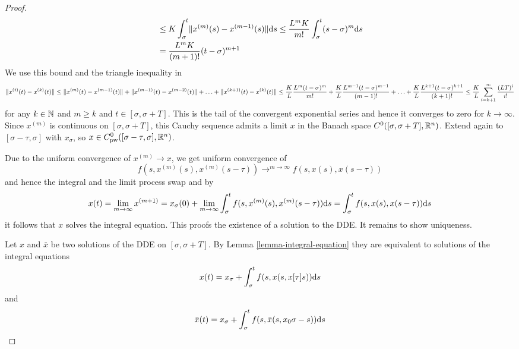 \documentclass[10pt]{article}
\begin{document}
\begin{proof}
\begin{align}
        & \leq K \int_\sigma^t \lVert x^{(m)}(s) - x^{(m-1)}(s)\rVert\text{d}s \leq \frac{L^m K}{m!} \int_\sigma^t (s-\sigma)^m\text{d}s\\
        & = \frac{L^m K}{(m+1)!}(t-\sigma)^{m+1}
    \end{align}
    We use this bound and the triangle inequality in
    \begin{equation}
        \lVert x^{(t)}(t)-x^{(k)}(t)\rVert\leq \lVert x^{(m)}(t)-x^{(m-1)}(t)\rVert + \lVert x^{(m-1)}(t)-x^{(m-2)}(t)\rVert +\ldots + \lVert x^{(k+1)}(t)-x^{(k)}(t)\rVert\\
        \leq \frac{K}{L}\frac{L^m (t-\sigma)^m}{m!} + \frac{K}{L}\frac{L^{m-1} (t-\sigma)^{m-1}}{(m-1)!} +\ldots +\frac{K}{L}\frac{L^{k+1} (t-\sigma)^{k+1}}{(k+1)!}\\
        \leq \frac{K}{L}\sum_{i=k+1}^\infty \frac{(LT)^i}{i!}
    \end{equation}
    for any $k\in\mathbb{N}$ and $m\geq k$ and $t\in [\sigma,\sigma+T]$.
    This is the tail of the convergent exponential series and hence it converges to zero for $k\rightarrow\infty$.
    Since $x^{(m)}$ is continuous on $[\sigma,\sigma+T]$, this Cauchy sequence admits a limit $x$ in the Banach space $C^0([\sigma,\sigma+T],\mathbb{R}^n)$. Extend again to $[\sigma-\tau,\sigma]$ with $x_\sigma$, so $x\in C^0_\text{pw}([\sigma-\tau,\sigma],\mathbb{R}^n)$.


    Due to the uniform convergence of $x^(m)\rightarrow x$, we get uniform convergence of
    \begin{equation}
        f(s,x^{(m)}(s),x^{(m)}(s-\tau)) \rightarrow^{m\rightarrow\infty} f(s,x(s),x(s-\tau))
    \end{equation}
    and hence the integral and the limit process swap and by
    \begin{equation}
        x(t) = \lim_{m\rightarrow\infty} x^{(m+1)} = x_\sigma(0) + \lim_{m\rightarrow\infty}\int_\sigma^t f(s,x^{(m)}(s),x^{(m)}(s-\tau))\text{d}s = \int_\sigma^t f(s,x(s),x(s-\tau))\text{d}s
    \end{equation}
    it follows that $x$ solves the integral equation.
    This proofs the existence of a solution to the DDE. It remains to show uniqueness.

    Let $x$ and $\bar{x}$ be two solutions of the DDE on $[\sigma,\sigma+T]$.
    By Lemma \ref{lemma-integral-equation} they are equivalent to solutions of the integral equations
    \begin{equation}
        x(t) = x_\sigma + \int_\sigma^t f(s,x(s,x[\tau]{s}))\text{d}s
    \end{equation}
    and
    \begin{equation}
        \bar{x}(t) = x_\sigma + \int_\sigma^t f(s,\bar{x}(s,x_0{\sigma-s}))\text{d}s
    \end{equation}


\end{proof}
\end{document}
